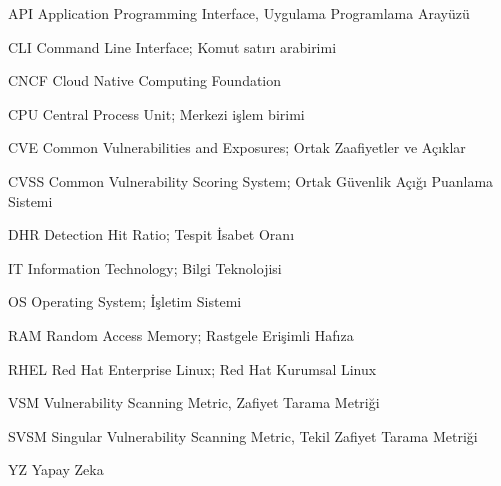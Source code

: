 \begin{simge}
	\item [API]     Application Programming Interface, Uygulama Programlama Arayüzü
	\item [CLI]     Command Line Interface; Komut satırı arabirimi
	\item [CNCF]    Cloud Native Computing Foundation
	\item [CPU]     Central Process Unit; Merkezi işlem birimi
	\item [CVE]     Common Vulnerabilities and Exposures; Ortak Zaafiyetler ve Açıklar
	\item [CVSS]    Common Vulnerability Scoring System; Ortak Güvenlik Açığı Puanlama Sistemi
	\item [DHR]     Detection Hit Ratio; Tespit İsabet Oranı
	\item [IT]      Information Technology; Bilgi Teknolojisi
	\item [OS]      Operating System; İşletim Sistemi
	\item [RAM]     Random Access Memory; Rastgele Erişimli Hafıza
	\item [RHEL]    Red Hat Enterprise Linux; Red Hat Kurumsal Linux
	\item [VSM]     Vulnerability Scanning Metric, Zafiyet Tarama Metriği
	\item [SVSM]     Singular Vulnerability Scanning Metric, Tekil Zafiyet Tarama Metriği
	\item [YZ]      Yapay Zeka
\end{simge}
